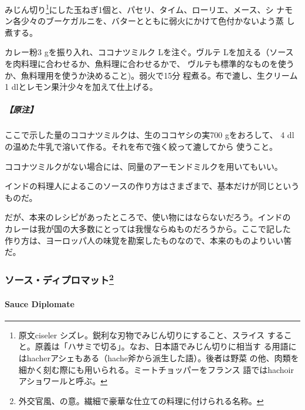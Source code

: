 \begin{recette}

みじん切り\footnote{原文ciseler
  シズレ。鋭利な刃物でみじん切りにすること、スライス
  すること。原義は「ハサミで切る」。なお、日本語でみじん切りに相当す
  る用語にはhacherアシェもある（hache斧から派生した語）。後者は野菜
  の他、肉類を細かく刻む際にも用いられる。ミートチョッパーをフランス
  語ではhachoirアショワールと呼ぶ。}にした玉ねぎ1個と、パセリ、タイム、ローリエ、メース、シ
ナモン各少々のブーケガルニを、バターとともに弱火にかけて色付かないよう蒸
し煮する。

カレー粉3 gを振り入れ、ココナツミルク\undemi{} Lを注ぐ。ヴルテ \undemi{}
Lを加える（ソースを肉料理に合わせるか、魚料理に合わせるかで、
ヴルテも標準的なものを使うか、魚料理用を使うか決めること)。弱火で15分
程煮る。布で漉し、生クリーム1 dlとレモン果汁少々を加えて仕上げる。

\hypertarget{ux539fux6ce8-7}{%
\subparagraph{【原注】}\label{ux539fux6ce8-7}}

ここで示した量のココナツミルクは、生のココヤシの実700 gをおろして、
4\undemi{} dlの温めた牛乳で溶いて作る。それを布で強く絞って漉してから
使うこと。

ココナツミルクがない場合には、同量のアーモンドミルクを用いてもいい。

インドの料理人によるこのソースの作り方はさまざまで、基本だけが同じというものだ。

だが、本来のレシピがあったところで、使い物にはならないだろう。インドの
カレーは我が国の大多数にとっては我慢ならぬものだろうから。ここで記した
作り方は、ヨーロッパ人の味覚を勘案したものなので、本来のものよりいい筈
だ。

\maeaki

\hypertarget{ux30bdux30fcux30b9ux30c7ux30a3ux30d7ux30edux30deux30c3ux30c844}{%
\subsubsection[ソース・ディプロマット]{\texorpdfstring{ソース・ディプロマット\footnote{外交官風、の意。繊細で豪華な仕立ての料理に付けられる名称。}}{ソース・ディプロマット}}\label{ux30bdux30fcux30b9ux30c7ux30a3ux30d7ux30edux30deux30c3ux30c844}}

\hypertarget{sauce-diplomate}{%
\paragraph{Sauce Diplomate}\label{sauce-diplomate}}


\end{recette}
